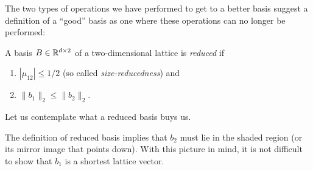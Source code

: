 The two types of operations we have performed to get to a better basis
suggest a definition of a ``good'' basis as one where these operations can no longer be performed:
\begin{definition}[$d=2$]
  \label{def:reduced-basis-2dim}
  A basis $B \in \mathbb{R}^{d\times 2}$ of a two-dimensional lattice is \emph{reduced} if
  \begin{enumerate}
    \item $|\mu_{12}| \leq 1/2$ (so called \emph{size-reducedness}) and
    \item $\|b_1\|_2 \leq \|b_2\|_2$.
  \end{enumerate}
\end{definition}
Let us contemplate what a reduced basis buys us.
\begin{center}
\end{center}
The definition of reduced basis implies that $b_2$ must lie in the shaded region
(or its mirror image that points down).
With this picture in mind, it is not difficult to show that $b_1$ is a shortest lattice vector.

